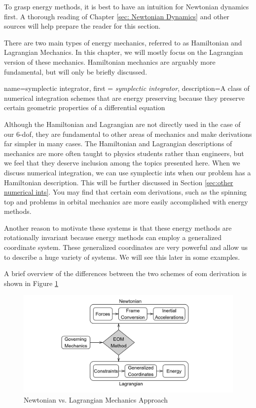 \documentclass[12pt]{report}
\begin{document}
To grasp energy methods, it is best to have an intuition for Newtonian dynamics first. A thorough reading of Chapter \ref{sec: Newtonian Dynamics} and other sources will help prepare the reader for this section.

There are two main types of energy mechanics, referred to as Hamiltonian and Lagrangian Mechanics. In this chapter, we will mostly focus on the Lagrangian version of these mechanics. Hamiltonian mechanics are arguably more fundamental, but will only be briefly discussed.

{
    name=symplectic integrator,
    first = {\textit{symplectic integrator}},
    description={A class of numerical integration schemes that are energy preserving because they preserve certain geometric properties of a differential equation}
}

Although the Hamiltonian and Lagrangian are not directly used in the case of our 6-\gls{dof}, they are fundamental to other areas of mechanics and make derivations far simpler in many cases. The Hamiltonian and Lagrangian descriptions of mechanics are more often taught to physics students rather than engineers, but we feel that they deserve inclusion among the topics presented here. When we discuss numerical integration, we can use \glspl{symplectic int} when our problem has a Hamiltonian description. This will be further discussed in Section \ref{sec:other numerical ints}. You may find that certain \gls{eom} derivations, such as the spinning top and problems in orbital mechanics are more easily accomplished with energy methods.

Another reason to motivate these systems is that these energy methods are rotationally invariant because energy methods can employ a generalized coordinate system. These generalized coordinates are very powerful and allow us to describe a huge variety of systems. We will see this later in some examples.

A brief overview of the differences between the two schemes of \gls{eom} derivation is shown in Figure \ref{fig:newt v lang}

\begin{figure}[ht]
    \centering
    
\includegraphics[width=\linewidth]{Images/diagram-20250322.png}

    \caption{Newtonian vs. Lagrangian Mechanics Approach}
    \label{fig:newt v lang}
\end{figure}
\end{document}
